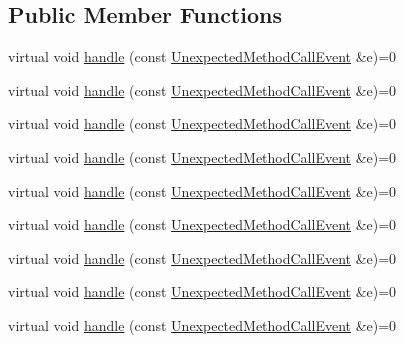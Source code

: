 \subsection*{Public Member Functions}
\begin{DoxyCompactItemize}
\item 
virtual void \mbox{\hyperlink{structfakeit_1_1EventHandler_a4de5ad05e5de73e36f4b2cede6d8efd3}{handle}} (const \mbox{\hyperlink{structfakeit_1_1UnexpectedMethodCallEvent}{Unexpected\+Method\+Call\+Event}} \&e)=0
\item 
virtual void \mbox{\hyperlink{structfakeit_1_1EventHandler_a4de5ad05e5de73e36f4b2cede6d8efd3}{handle}} (const \mbox{\hyperlink{structfakeit_1_1UnexpectedMethodCallEvent}{Unexpected\+Method\+Call\+Event}} \&e)=0
\item 
virtual void \mbox{\hyperlink{structfakeit_1_1EventHandler_a4de5ad05e5de73e36f4b2cede6d8efd3}{handle}} (const \mbox{\hyperlink{structfakeit_1_1UnexpectedMethodCallEvent}{Unexpected\+Method\+Call\+Event}} \&e)=0
\item 
virtual void \mbox{\hyperlink{structfakeit_1_1EventHandler_a4de5ad05e5de73e36f4b2cede6d8efd3}{handle}} (const \mbox{\hyperlink{structfakeit_1_1UnexpectedMethodCallEvent}{Unexpected\+Method\+Call\+Event}} \&e)=0
\item 
virtual void \mbox{\hyperlink{structfakeit_1_1EventHandler_a4de5ad05e5de73e36f4b2cede6d8efd3}{handle}} (const \mbox{\hyperlink{structfakeit_1_1UnexpectedMethodCallEvent}{Unexpected\+Method\+Call\+Event}} \&e)=0
\item 
virtual void \mbox{\hyperlink{structfakeit_1_1EventHandler_a4de5ad05e5de73e36f4b2cede6d8efd3}{handle}} (const \mbox{\hyperlink{structfakeit_1_1UnexpectedMethodCallEvent}{Unexpected\+Method\+Call\+Event}} \&e)=0
\item 
virtual void \mbox{\hyperlink{structfakeit_1_1EventHandler_a4de5ad05e5de73e36f4b2cede6d8efd3}{handle}} (const \mbox{\hyperlink{structfakeit_1_1UnexpectedMethodCallEvent}{Unexpected\+Method\+Call\+Event}} \&e)=0
\item 
virtual void \mbox{\hyperlink{structfakeit_1_1EventHandler_a4de5ad05e5de73e36f4b2cede6d8efd3}{handle}} (const \mbox{\hyperlink{structfakeit_1_1UnexpectedMethodCallEvent}{Unexpected\+Method\+Call\+Event}} \&e)=0
\item 
virtual void \mbox{\hyperlink{structfakeit_1_1EventHandler_a4de5ad05e5de73e36f4b2cede6d8efd3}{handle}} (const \mbox{\hyperlink{structfakeit_1_1UnexpectedMethodCallEvent}{Unexpected\+Method\+Call\+Event}} \&e)=0
\item 

\end{DoxyCompactItemize}
